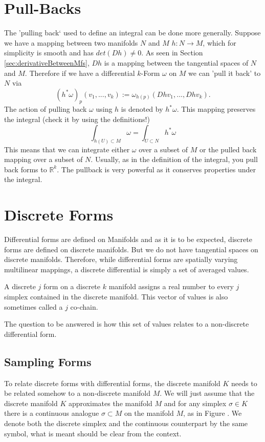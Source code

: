 \section{Pull-Backs}
The 'pulling back` used to define an integral can be done more generally. Suppose we have a mapping between two manifolds $N$ and $M$ $h: N\to M$, which for simplicity  is smooth and has $det(Dh) \neq 0$. As seen in Section \ref{sec:derivativeBetweenMfs}, $Dh$ is a mapping between the tangential spaces of $N$ and $M$. Therefore if we have a differential $k$-Form $\omega$ on $M$ we can 'pull it back' to $N$ via
\[(h^*\omega)_p (v_1,...,v_k) := \omega_{h(p)}(Dh v_1,...,Dh v_k). \]
 The action of pulling back $\omega$ using $h$ is denoted by $h^* \omega$. This mapping preserves the integral (check it by using the definitions!)
\[\int_{h(U)\subset M} \omega = \int_{U \subset N} h^*\omega \]
This means that we can integrate either $\omega$ over a subset of $M$ or the pulled back mapping over a subset of $N$. Usually, as in the definition of the integral, you pull back forms to $\mathbb R^k$.
The pullback is very powerful as it conserves properties under the integral. 

\section{Discrete Forms}
Differential forms are defined on Manifolds and as it is to be expected, discrete forms are defined on discrete manifolds. But we do not have tangential spaces on discrete manifolds. Therefore, while differential forms are spatially varying multilinear mappings, a discrete differential is simply a set of averaged values.

\begin{definition}
A discrete $j$ form on a discrete $k$ manifold assigns a real number to every $j$ simplex contained in the discrete manifold.  This vector of values is also sometimes called a $j$ co-chain. 
\end{definition}
The question to be answered is how this set of values relates to a non-discrete differential form.

\subsection{Sampling Forms}
To relate discrete forms with differential forms, the discrete manifold $K$ needs to be related somehow to a non-discrete manifold $M$. We will just assume that the discrete manifold $K$ approximates the manifold $M$ and for any simplex $\sigma \in K$ there is a continuous analogue $\sigma \subset M$ on the manifold $M$, as in Figure . We denote both the discrete simplex and the continuous counterpart by the same symbol, what is meant should be clear from the context.

